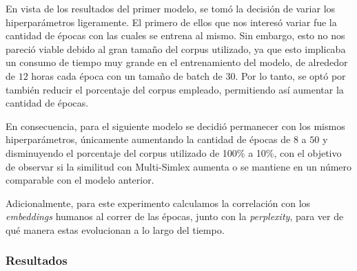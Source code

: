 En vista de los resultados del primer modelo, se tomó la decisión de variar los hiperparámetros 
ligeramente. El primero de ellos que nos interesó variar fue la cantidad de épocas con las 
cuales se entrena al mismo. Sin embargo, esto no nos pareció viable debido al gran tamaño 
del corpus utilizado, ya que esto implicaba un consumo de tiempo muy grande en el entrenamiento 
del modelo, de alrededor de $12$ horas cada época con un tamaño de batch de $30$. Por lo tanto, 
se optó por también reducir el porcentaje del corpus empleado, permitiendo así aumentar la 
cantidad de épocas.

En consecuencia, para el siguiente modelo se decidió permanecer con los mismos hiperparámetros, 
únicamente aumentando la cantidad de épocas de $8$ a $50$ y disminuyendo el porcentaje del corpus 
utilizado de 100\% a 10\%, con el objetivo de observar si la similitud con Multi-Simlex 
aumenta o se mantiene en un número comparable con el modelo anterior.

Adicionalmente, para este experimento calculamos la correlación con los \textit{embeddings} humanos 
al correr de las épocas, junto con la \textit{perplexity}, para ver de qué manera estas evolucionan 
a lo largo del tiempo.

\subsubsection{Resultados}


